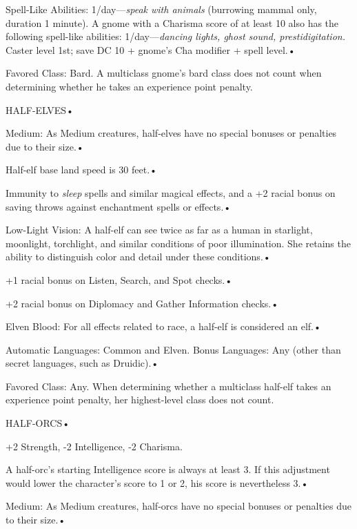\documentclass{article}
\begin{document}
\parindent=3pt
Spell-Like Abilities: 1/day---\textit{speak with animals }(burrowing mammal only, 
duration 1 minute). A gnome with a Charisma score of at least 10 also has the following 
spell-like abilities: 1/day---\textit{dancing lights, ghost sound, prestidigitation. 
}Caster level 1st; save DC 10 + gnome's Cha modifier + spell level.• 

Favored Class: Bard. A multiclass gnome's bard class does not count when determining 
whether he takes an experience point penalty.

\vspace{12pt}
\parindent=0pt
{\LARGE{}HALF-ELVES• }

\parindent=3pt
Medium: As Medium creatures, half-elves have no special bonuses or penalties due 
to their size.• 

Half-elf base land speed is 30 feet.• 

\parindent=7pt
Immunity to \textit{sleep }spells and similar magical effects, and a +2 racial 
bonus on saving throws against enchantment spells or effects.• 

\parindent=3pt
Low-Light Vision: A half-elf can see twice as far as a human in starlight, moonlight, 
torchlight, and similar conditions of poor illumination. She retains the ability 
to distinguish color and detail under these conditions.• 

+1 racial bonus on Listen, Search, and Spot checks.• 

\parindent=7pt
+2 racial bonus on Diplomacy and Gather Information checks.• 

\parindent=3pt
Elven Blood: For all effects related to race, a half-elf is considered an elf.• 

Automatic Languages: Common and Elven. Bonus Languages: Any (other than secret 
languages, such as Druidic).• 

\parindent=7pt
Favored Class: Any. When determining whether a multiclass half-elf takes an experience 
point penalty, her highest-level class does not count.

\vspace{12pt}
\parindent=0pt
{\LARGE{}HALF-ORCS• }

\parindent=3pt
+2 Strength, -2 Intelligence, -2 Charisma.

\parindent=0pt
A half-orc's starting Intelligence score is always at least 3. If this adjustment 
would lower the character's score to 1 or 2, his score is nevertheless 3.• 

\parindent=3pt
Medium: As Medium creatures, half-orcs have no special bonuses or penalties due 
to their size.• 
\end{document}
